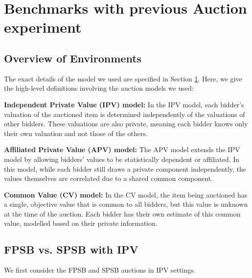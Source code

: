 \documentclass{article} %
\begin{document}


\section{Benchmarks with previous Auction experiment}\label{results}


\subsection{Overview of Environments}
The exact details of the model we used are specified in Section \ref{results}. Here, we give the high-level definitions involving the auction models we used: 

\textbf{Independent Private Value (IPV) model:} In the IPV model, each bidder's valuation of the auctioned item is determined independently of the valuations of other bidders. These valuations are also private, meaning each bidder knows only their own valuation and not those of the others.


\textbf{Affiliated Private Value (APV) model:} The APV model extends the IPV model by allowing bidders' values to be statistically dependent or affiliated. In this model, while each bidder still draws a private component independently, the values themselves are correlated due to a shared common component.


\textbf{Common Value (CV) model:} In the CV model, the item being auctioned has a single, objective value that is common to all bidders, but this value is unknown at the time of the auction. Each bidder has their own estimate of this common value, modelled based on their private information. 

\subsection{FPSB vs. SPSB with IPV}\label{section:classic}
We first consider the FPSB and SPSB auctions in IPV settings. 
\end{document}

